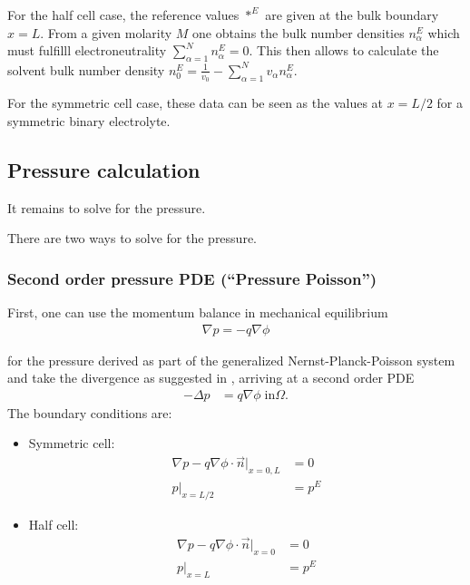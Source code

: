 \documentclass[12pt,oneside,reqno]{amsart}
\begin{document}
For the half cell case, the reference values $\ast^E$ are given at the bulk boundary $x=L$.
From a given molarity $M$ one obtains the bulk number densities $n_\alpha^E$ which
must fulfilll electroneutrality $\sum_{\alpha=1}^N n_\alpha^E =0$. This then allows to calculate
the solvent bulk number density $n_0^E=\frac{1}{v_0} - \sum_{\alpha=1}^N v_\alpha n_\alpha^E$.

For the symmetric cell case, these data can be seen as the values at $x=L/2$ for a symmetric
binary electrolyte.


\subsection{Pressure calculation}


It remains to solve for the pressure.

There are two ways to solve for the pressure.

\subsubsection{Second order pressure PDE (``Pressure Poisson'')}

First, one can use the momentum balance in mechanical equilibrium
\begin{align}
  \label{eq:momentumbalance}
  \nabla p = -q\nabla \phi
\end{align}

for the pressure derived as part of the generalized Nernst-Planck-Poisson
system \cite{dreyer2013overcoming} and take the divergence as suggested in \cite{Fuhrmann2015xCPC}, arriving at
a second order PDE
\begin{equation}\label{eq:pressurePDE}
  \begin{aligned}
    - \Delta p & = q\nabla\phi  \; \text{in} \Omega.
  \end{aligned}
\end{equation}
The boundary conditions are:

\begin{itemize}
  \item Symmetric cell:
        \begin{equation}\label{eq:symmcell}
          \begin{aligned}
            \nabla p - q\nabla\phi\cdot \vec n|_{x=0,L} & =0   \\
            p|_{x=L/2}                                  & =p^E
          \end{aligned}
        \end{equation}
  \item Half cell:
        \begin{equation}\label{eq:phalfcell}
          \begin{aligned}
            \nabla p - q\nabla\phi\cdot \vec n|_{x=0} & =0   \\
            p|_{x=L}                                  & =p^E
          \end{aligned}
        \end{equation}
\end{itemize}
\end{document}
